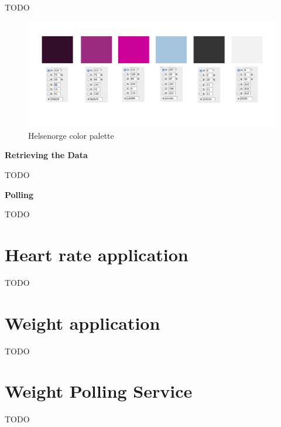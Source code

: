 TODO

\begin{figure}[h]
\centering
\includegraphics[scale=0.30]{../Figures/helsenorge_pallett.jpg}
\caption{Helsenorge color palette}
\label{figure:helsenorge-color-palette}
\end{figure}

\textbf{Retrieving the Data}

TODO

\textbf{Polling}

TODO

\section{Heart rate application}

TODO

\section{Weight application}

TODO

\section{Weight Polling Service}

TODO

